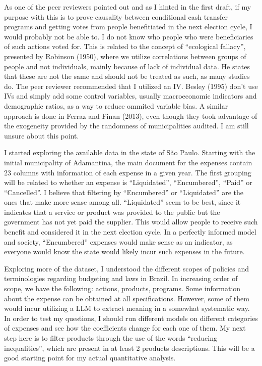 \documentclass[12pt, a4paper]{article}
\begin{document}
\quad As one of the peer reviewers pointed out and as I hinted in the first draft, if my purpose with this is to prove causality between conditional cash transfer programs and getting votes from people benefitiated in the next election cycle, I would probably not be able to. I do not know who people who were beneficiaries of such actions voted for. This is related to the concept of ``ecological fallacy'', presented by Robinson (1950), where we utilize correlations between groups of people and not individuals, mainly because of lack of individual data. He states that these are not the same and should not be treated as such, as many studies do. The peer reviewer recommended that I utilized an IV. Besley (1995) don't use IVs and simply add some control variables, usually macroeconomic indicators and demographic ratios, as a way to reduce ommited variable bias. A similar approach is done in Ferraz and Finan (2013), even though they took advantage of the exogeneity provided by the randomness of municipalities audited. I am still unsure about this point.

\quad I started exploring the available data in the state of São Paulo. Starting with the initial municipality of Adamantina, the main document for the expenses contain 23 columns with information of each expense in a given year. The first grouping will be related to whether an expense is ``Liquidated'', ``Encumbered'', ``Paid'' or ``Cancelled''. I believe that filtering by ``Encumbered'' or ``Liquidated'' are the ones that make more sense among all. ``Liquidated'' seem to be best, since it indicates that a service or product was provided to the public but the government has not yet paid the supplier. This would allow people to receive such benefit and considered it in the next election cycle. In a perfectly informed model and society, ``Encumbered'' expenses would make sense as an indicator, as everyone would know the state would likely incur such expenses in the future.

\quad Exploring more of the dataset, I understood the different scopes of policies and terminologies regarding budgeting and laws in Brazil. In increasing order of scope, we have the following: actions, products, programs. Some information about the expense can be obtained at all specifications. However, some of them would incur utilizing a LLM to extract meaning in a somewhat systematic way. In order to test my questions, I should run different models on different categories of expenses and see how the coefficients change for each one of them. My next step here is to filter products through the use of the words ``reducing inequalities'', which are present in at least 2 products descriptions. This will be a good starting point for my actual quantitative analysis.
\end{document}
